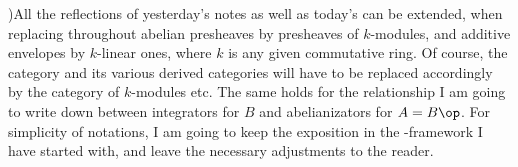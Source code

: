 )\enspace All the reflections of yesterday's
notes as well as today's can be extended, when replacing throughout
abelian presheaves by presheaves of $k$-modules, and
additive envelopes by $k$-linear ones, where $k$ is any given
commutative ring. Of course, the category \Ab{} and its various
derived categories will have to be replaced accordingly by the
category \kMod{} of $k$-modules etc. The same holds for the
relationship I am going to write down between integrators for $B$ and
abelianizators for $A=B\op$. For simplicity of notations, I am going
to keep the exposition in the \Ab-framework I have started with, and
leave the necessary adjustments to the reader.

\bigbreak
\noindent\hfill{}\par

